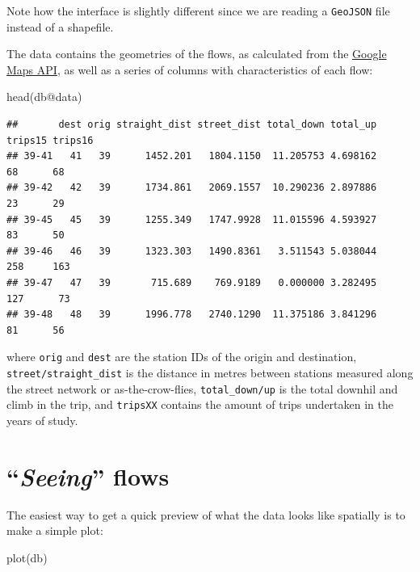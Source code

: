\documentclass[
]{book}
\newenvironment{Shaded}{\begin{snugshade}}{\end{snugshade}}
\newcommand{\FunctionTok}[1]{\textcolor[rgb]{0.00,0.00,0.00}{#1}}
\newcommand{\NormalTok}[1]{#1}
\newcommand{\SpecialCharTok}[1]{\textcolor[rgb]{0.00,0.00,0.00}{#1}}
\begin{document}
Note how the interface is slightly different since we are reading a \texttt{GeoJSON} file instead of a shapefile.

The data contains the geometries of the flows, as calculated from the \href{https://developers.google.com/maps/}{Google Maps API}, as well as a series of columns with characteristics of each flow:

\begin{Shaded}
\begin{Highlighting}[]
\FunctionTok{head}\NormalTok{(db}\SpecialCharTok{@}\NormalTok{data)}
\end{Highlighting}
\end{Shaded}

\begin{verbatim}
##       dest orig straight_dist street_dist total_down total_up trips15 trips16
## 39-41   41   39      1452.201   1804.1150  11.205753 4.698162      68      68
## 39-42   42   39      1734.861   2069.1557  10.290236 2.897886      23      29
## 39-45   45   39      1255.349   1747.9928  11.015596 4.593927      83      50
## 39-46   46   39      1323.303   1490.8361   3.511543 5.038044     258     163
## 39-47   47   39       715.689    769.9189   0.000000 3.282495     127      73
## 39-48   48   39      1996.778   2740.1290  11.375186 3.841296      81      56
\end{verbatim}

where \texttt{orig} and \texttt{dest} are the station IDs of the origin and destination, \texttt{street/straight\_dist} is the distance in metres between stations measured along the street network or as-the-crow-flies, \texttt{total\_down/up} is the total downhil and climb in the trip, and \texttt{tripsXX} contains the amount of trips undertaken in the years of study.

\hypertarget{seeing-flows}{%
\section{\texorpdfstring{``\emph{Seeing}'' flows}{``Seeing'' flows}}\label{seeing-flows}}

The easiest way to get a quick preview of what the data looks like spatially is to make a simple plot:

\begin{Shaded}
\begin{Highlighting}[]
\FunctionTok{plot}\NormalTok{(db)}
\end{Highlighting}
\end{Shaded}
\end{document}

